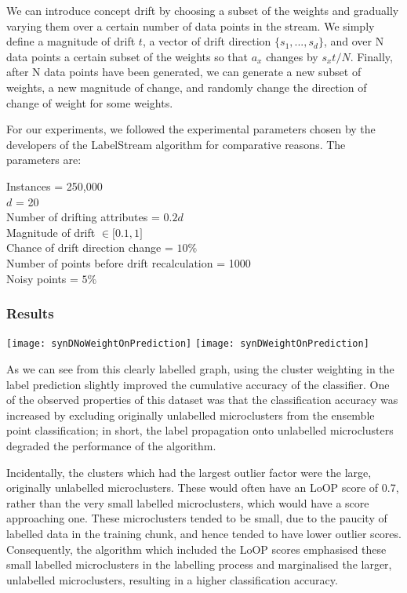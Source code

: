 \documentclass[12pt,a4paper,oneside]{report}
\begin{document}
We can introduce concept drift by choosing a subset of the weights and gradually varying them over a certain number of data points in the stream. We simply define a magnitude of drift \(t\), a vector of drift direction  \( \lbrace s_1,...,s_d  \rbrace \), and over N data points a certain subset of the weights so that \( a_x \) changes by \(  s_xt / N \). Finally, after N data points have been generated, we can generate a new subset of weights, a new magnitude of change, and randomly change the direction of change of weight for some weights.

For our experiments, we followed the experimental parameters chosen by the developers of the LabelStream algorithm for comparative reasons. The parameters are:

Instances = 250,000\\
\(d\) = 20 \\
Number of drifting attributes = \(0.2d\)\\
Magnitude of drift \(\in \lbrack 0.1,1\rbrack \) \\
Chance of drift direction change = \(10 \% \) \\
Number of points before drift recalculation  = 1000\\
Noisy points = \(5\% \)
\subsubsection{Results}

\texttt{[image: synDNoWeightOnPrediction]}
\texttt{[image: synDWeightOnPrediction]}

As we can see from this clearly labelled graph, using the cluster weighting in the label prediction slightly improved the cumulative accuracy of the classifier.  One of the observed properties of this dataset was that the classification accuracy was increased by excluding originally unlabelled microclusters from the ensemble point classification; in short, the label propagation onto unlabelled microclusters degraded the performance of the algorithm. 

Incidentally, the clusters which had the largest outlier factor were the large, originally unlabelled microclusters. These would often have an LoOP score of 0.7, rather than the very small labelled microclusters, which would have a score approaching one. These microclusters tended to be small, due to the paucity of labelled data in the training chunk, and hence tended to have lower outlier scores. Consequently, the algorithm which included the LoOP scores emphasised these small labelled microclusters in the labelling process and marginalised the larger, unlabelled microclusters, resulting in a higher classification accuracy. 
\end{document}
